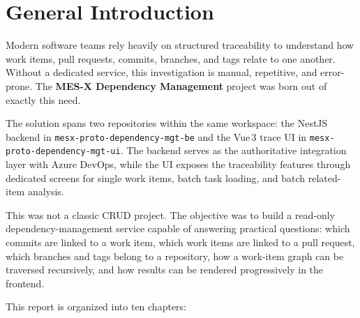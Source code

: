 \documentclass[12pt,a4paper]{report}
\newcommand{\code}[1]{\texttt{\small\color{codered}#1}}
\begin{document}
\chapter*{General Introduction}

\vspace{0.4cm}

Modern software teams rely heavily on structured traceability to understand how
work items, pull requests, commits, branches, and tags relate to one another.
Without a dedicated service, this investigation is manual, repetitive, and
error-prone. The \textbf{MES-X Dependency Management} project was born out of
exactly this need.

\medskip
The solution spans two repositories within the same workspace: the NestJS backend
in \code{mesx-proto-dependency-mgt-be} and the Vue\,3 trace UI in
\code{mesx-proto-dependency-mgt-ui}. The backend serves as the authoritative
integration layer with Azure DevOps, while the UI exposes the traceability
features through dedicated screens for single work items, batch task loading, and
batch related-item analysis.

\medskip
This was not a classic CRUD project. The objective was to build a read-only
dependency-management service capable of answering practical questions: which
commits are linked to a work item, which work items are linked to a pull request,
which branches and tags belong to a repository, how a work-item graph can be
traversed recursively, and how results can be rendered progressively in the
frontend.

\bigskip
\noindent This report is organized into ten chapters:
\end{document}
